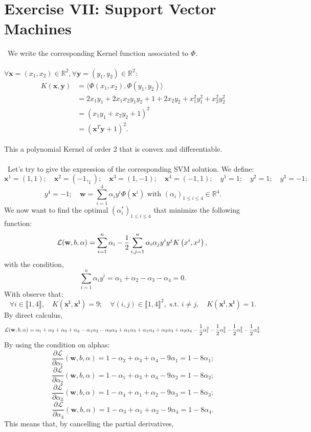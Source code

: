 \section{Exercise VII: Support Vector Machines}

\bullet \  We write the corresponding Kernel function associated to $\Phi$.\\ \\
$\forall \textbf{x} = (x_1, x_2) \in \mathbb{R}^2, \forall \mathbf{y} = (y_1, y_2) \in \mathbb{R}^2:$
\begin{align*}
    K\left(\mathbf{x}, \mathbf{y} \right) 
    &= \langle \Phi(x_1, x_2), \Phi(y_1, y_2) \rangle \\
    &= 2x_1y_1 + 2x_1x_2y_1y_2 + 1 + 2x_2y_2 + x_1^2y_1^2 + x_2^2y_2^2 \\
    &= (x_1y_1 + x_2y_2 + 1)^2 \\
    &\boxed{= (\mathbf{x}^T \mathbf{y} + 1)^2.}
\end{align*}

This a polynomial Kernel of order 2 that is convex and differentiable.\\ \\
\bullet \ Let's try to give the expression of the corresponding SVM solution. We define: 
\[
\mathbf{x}^1 = (1, 1); \quad
\mathbf{x}^2 = (-1, _1); \quad
\mathbf{x}^3 = (1, -1); \quad
\mathbf{x}^4 = (-1, 1); \quad
y^1 = 1; \quad
y^2 = 1; \quad
y^3 = -1; 
\]
\[
y^4 = -1;\quad
\mathbf{w} = \sum_{i=1}^{4} \alpha_i y^i \Phi(\mathbf{x}^i) \text{ with } (\alpha_i)_{1 \le i \le 4} \in \mathbb{R}^4.
\]
We now want to find the optimal $(\alpha_i^{*})_{1 \le i \le 4}$ that minimize the following function:
\[
    \mathcal{L}(\mathbf{w}, b, \alpha)=\sum_{i=1}^n \alpha_i-\frac{1}{2} \sum_{i, j=1}^n \alpha_i \alpha_j y^i y^j K\left(x^i, x^j\right), \\
\]
with the condition,
\[
    \sum_{i=1}^n \alpha_i y^i = \alpha_1 + \alpha_2 - \alpha_3 - \alpha_4 = 0.
\]
With observe that:
\[
    \forall i \in \llbracket 1, 4 \rrbracket, \quad K(\mathbf{x^i}, \mathbf{x^i}) = 9 ; \quad
    \forall (i, j) \in \llbracket 1, 4 \rrbracket^2, \text{ s.t. } i \neq j, \quad K(\mathbf{x^i}, \mathbf{x^i}) = 1.
\]
By direct calculus,
\[
    \mathcal{L}(\mathbf{w}, b, \alpha) = \alpha_1 + \alpha_2 + \alpha_3 + \alpha_4 - \alpha_1 \alpha_2 - \alpha_3 \alpha_4 + \alpha_1 \alpha_3 +\alpha_1 \alpha_4 + \alpha_2 \alpha_3 + \alpha_2 \alpha_4 \\
    -\frac{1}{2}\alpha_1^2 -\frac{1}{2}\alpha_2^2 -\frac{1}{2}\alpha_3^2 -\frac{1}{2}\alpha_4^2.
\]
By using the condition on alphas:
\[
    \frac{\partial \mathcal{L}}{\partial \alpha_1} (\mathbf{w}, b, \alpha) = 1 - \alpha_2 + \alpha_3 + \alpha_4 - 9\alpha_1 = 1 - 8\alpha_1;
\]
\[
    \frac{\partial \mathcal{L}}{\partial \alpha_2} (\mathbf{w}, b, \alpha) = 1 - \alpha_1 + \alpha_3 + \alpha_4 - 9\alpha_2 = 1 - 8\alpha_2;
\]
\[
    \frac{\partial \mathcal{L}}{\partial \alpha_3} (\mathbf{w}, b, \alpha) = 1 - \alpha_4 + \alpha_1 + \alpha_2 - 9\alpha_3 = 1 - 8\alpha_3;
\]
\[
    \frac{\partial \mathcal{L}}{\partial \alpha_4} (\mathbf{w}, b, \alpha) = 1 - \alpha_3 + \alpha_1 + \alpha_2 - 9\alpha_4 = 1 - 8\alpha_4.
\]
This means that, by cancelling the partial derivatives,

